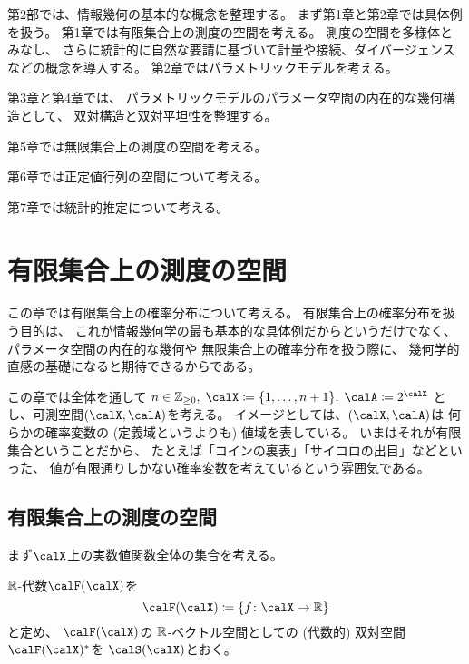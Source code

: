 \documentclass[report]{jlreq}
\begin{document}
第2部では、情報幾何の基本的な概念を整理する。
まず第1章と第2章では具体例を扱う。
第1章では有限集合上の測度の空間を考える。
測度の空間を多様体とみなし、
さらに統計的に自然な要請に基づいて計量や接続、ダイバージェンスなどの概念を導入する。
第2章ではパラメトリックモデルを考える。

第3章と第4章では、
パラメトリックモデルのパラメータ空間の内在的な幾何構造として、
双対構造と双対平坦性を整理する。

第5章では無限集合上の測度の空間を考える。

第6章では正定値行列の空間について考える。

第7章では統計的推定について考える。

%
\chapter{有限集合上の測度の空間}

この章では有限集合上の確率分布について考える。
有限集合上の確率分布を扱う目的は、
これが情報幾何学の最も基本的な具体例だからというだけでなく、
パラメータ空間の内在的な幾何や
無限集合上の確率分布を扱う際に、
幾何学的直感の基礎になると期待できるからである。

この章では全体を通して
$n \in \Z_{\ge 0}, \;
    \calX \coloneqq \{ 1, \dots, n + 1 \}, \;
    \calA \coloneqq 2^\calX$
とし、可測空間$(\calX, \calA)$を考える。
イメージとしては、$(\calX, \calA)$は
何らかの確率変数の (定義域というよりも) 値域を表している。
いまはそれが有限集合ということだから、
たとえば「コインの裏表」「サイコロの出目」などといった、
値が有限通りしかない確率変数を考えているという雰囲気である。

%
\section{有限集合上の測度の空間}

まず$\calX$上の実数値関数全体の集合を考える。

\begin{definition}
    $\mathbb{R}$-代数$\calF(\calX)$を
    \begin{equation}
        \calF(\calX)
            \coloneqq \mybrace{
                f \colon \calX \to \R
            }
    \end{equation}
    と定め、
    $\calF(\calX)$の
    $\mathbb{R}$-ベクトル空間としての (代数的) 双対空間$\calF(\calX)^*$を
    $\calS(\calX)$とおく。
\end{definition}
\end{document}
